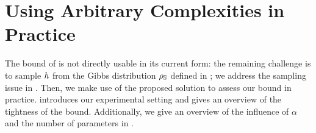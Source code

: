 \section{Using Arbitrary Complexities in Practice}
\label{chap:dis-mu:sec:experiments}

The bound of  is not directly usable in its current form:
the remaining challenge is to sample $h$ from the Gibbs distribution $\rho_{\mathbb{S}}$ defined in ; we address the sampling issue in .
Then, we make use of the proposed solution to assess our bound in practice. 
 introduces our experimental setting and  gives an overview of the tightness of the bound.
Additionally, we give an overview of the influence of $\alpha$ and the number of parameters in .


